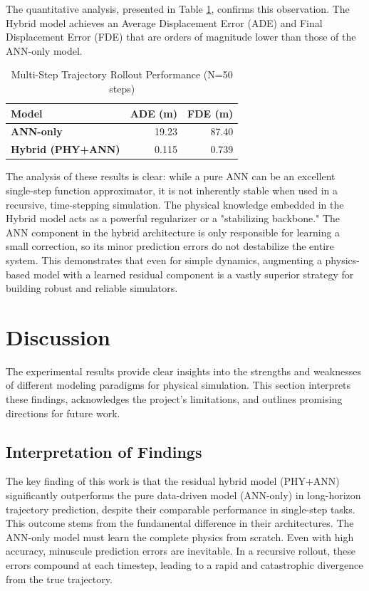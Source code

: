 \documentclass[conference]{IEEEtran}
\begin{document}
The quantitative analysis, presented in Table \ref{tab:multi_step}, confirms this observation. The Hybrid model achieves an Average Displacement Error (ADE) and Final Displacement Error (FDE) that are orders of magnitude lower than those of the ANN-only model.

\begin{table}[htbp]
\caption{Multi-Step Trajectory Rollout Performance (N=50 steps)}
\begin{center}
\begin{tabular}{|l|r|r|}
\hline
\textbf{Model} & \textbf{ADE (m)} & \textbf{FDE (m)} \\
\hline
\textbf{ANN-only} & 19.23 & 87.40 \\
\textbf{Hybrid (PHY+ANN)} & 0.115 & 0.739 \\
\hline
\end{tabular}
\label{tab:multi_step}
\end{center}
\end{table}

The analysis of these results is clear: while a pure ANN can be an excellent single-step function approximator, it is not inherently stable when used in a recursive, time-stepping simulation. The physical knowledge embedded in the Hybrid model acts as a powerful regularizer or a "stabilizing backbone." The ANN component in the hybrid architecture is only responsible for learning a small correction, so its minor prediction errors do not destabilize the entire system. This demonstrates that even for simple dynamics, augmenting a physics-based model with a learned residual component is a vastly superior strategy for building robust and reliable simulators.
\section{Discussion}
The experimental results provide clear insights into the strengths and weaknesses of different modeling paradigms for physical simulation. This section interprets these findings, acknowledges the project's limitations, and outlines promising directions for future work.

\subsection{Interpretation of Findings}
The key finding of this work is that the residual hybrid model (PHY+ANN) significantly outperforms the pure data-driven model (ANN-only) in long-horizon trajectory prediction, despite their comparable performance in single-step tasks. This outcome stems from the fundamental difference in their architectures. The ANN-only model must learn the complete physics from scratch. Even with high accuracy, minuscule prediction errors are inevitable. In a recursive rollout, these errors compound at each timestep, leading to a rapid and catastrophic divergence from the true trajectory.
\end{document}
